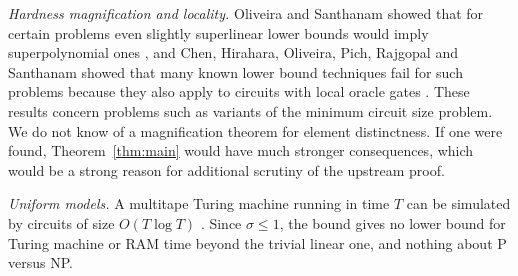 \documentclass[11pt]{amsart}
\theoremstyle{definition}
\theoremstyle{remark}
\begin{document}
\emph{Hardness magnification and locality.} Oliveira and Santhanam showed that for certain problems even slightly superlinear lower bounds would imply superpolynomial ones \cite{OS18}, and Chen, Hirahara, Oliveira, Pich, Rajgopal and Santhanam showed that many known lower bound techniques fail for such problems because they also apply to circuits with local oracle gates \cite{CHOPRS22}. These results concern problems such as variants of the minimum circuit size problem. We do not know of a magnification theorem for element distinctness. If one were found, Theorem~\ref{thm:main} would have much stronger consequences, which would be a strong reason for additional scrutiny of the upstream proof.

\emph{Uniform models.} A multitape Turing machine running in time $T$ can be simulated by circuits of size $O(T\log T)$ \cite{PF79}. Since $\sigma\le 1$, the bound gives no lower bound for Turing machine or RAM time beyond the trivial linear one, and nothing about P versus NP.
\end{document}
